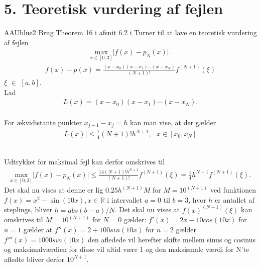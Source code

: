 \section*{5. Teoretisk vurdering af fejlen}
%
\begin{color}{AAUblue2} 
Brug Theorem 16 i afsnit 6.2 i Turner til at lave en teoretisk vurdering af fejlen
\begin{align*}
\underset{x \in \left [0,3 \right ]}{\text{max}} \lvert f(x)-p_N(x) \rvert.
\end{align*}
%
\begin{align*}
f(x)-p(x) = \frac{(x-x_0)(x-x_1)\cdots(x-x_N)}{(N+1)!}f^{(N+1)}(\xi)
\end{align*}
 $\xi$ $\in$ $\left [a,b \right ]$.
\\
Lad
\begin{align*}
L(x)=(x-x_0)(x-x_1)\cdots(x-x_N).
\end{align*}
\\
For ækvidistante punkter $x_{j+1} - x_j = h$ kan man vise, at der gælder
\begin{align*}
\lvert L(x) \rvert \leq \frac{1}{4}(N+1)!h^{N+1}, \text{   } x \in \left [x_0, x_N \right ].
\end{align*}
\end{color}
\\
%
Udtrykket for maksimal fejl kan derfor omskrives til
\begin{align*}
\underset{x \in \left [0,3 \right ]}{\text{max}} \lvert f(x)-p_N(x) \rvert \leq \frac{{1}{4}(N+1)!h^{N+1}}{(N+1)!}f^{(N+1)}(\xi)=\frac{1}{4}h^{N+1}f^{(N+1)}(\xi).
\end{align*}
Det skal nu vises at denne er lig  $0.25h^{(N+1)}M$ for $M=10^{(N+1)}$ ved funktionen $f(x)=x^2-\sin(10x), x \in \mathbb{R}$ i intervallet $a=0$ til $b=3$, hvor $h$ er antallet af steplings, bliver $h=abs(b-a)/N$. 
Det skal nu vises at $f(x)^{(N+1)}(\xi)$ kan omskrives til $M=10^{(N+1)}$
for $N=0$ gælder: $f'(x)=2x-10cos(10x)$ for $n=1$ gælder at $f''(x)=2+100sin(10x)$ for $n=2$ gælder $f'''(x)=1000sin(10x)$ den afledede vil herefter skifte mellem sinus og cosinus og maksimalværdien for disse vil altid være 1 og den maksismale værdi for N'te afledte bliver derfor $10^{N+1}$.
\\
